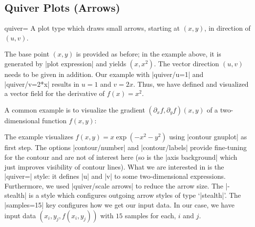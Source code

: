 {\subsection{Quiver Plots (Arrows)}
\label{sec:pgfplots:quiver2d}

\begin{plottype}[/pgfplots]{quiver=%
    \textcolor{black}{}%
}
    A plot type which draws small arrows, starting at $(x,y)$, in direction of
    $(u,v)$.
\begin{codeexample}[]
\end{codeexample}

    The base point $(x,y)$ is provided as before; in the example above, it is
    generated by |plot expression| and yields $(x,x^2)$. The vector direction
    $(u,v)$ needs to be given in addition. Our example with |quiver/u=1| and
    |quiver/v=2*x| results in $u=1$ and $v=2x$. Thus, we have defined and
    visualized a vector field for the derivative of $f(x) = x^2$.

    A common example is to visualize the gradient $(\partial_x f,\partial_y
    f)(x,y)$ of a two-dimensional function $f(x,y)$:
\pgfplotsexpensiveexample
\begin{codeexample}[]
\end{codeexample}
    \noindent The example visualizes $f(x,y) = x\exp(-x^2-y^2)$ using
    |contour gnuplot| as first step. The options |contour/number| and
    |contour/labels| provide fine-tuning for the contour and are not of interest
    here (so is the |axis background| which just improves visibility of contour
    lines). What we are interested in is the |quiver=| style: it defines |u| and
    |v| to some two-dimensional expressions. Furthermore, we used
    |quiver/scale arrows| to reduce the arrow size. The |-stealth| is a \Tikz{}
    style which configures outgoing arrow styles of type `|stealth|'. The
    |samples=15| key configures how we get our input data. In our case, we have
    input data $(x_i,y_j,f(x_i,y_j))$ with $15$ samples for each, $i$ and $j$.


\end{plottype}}
